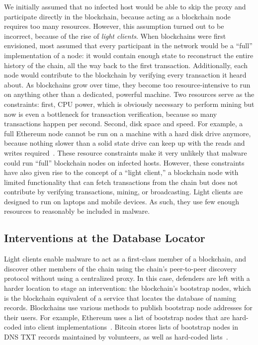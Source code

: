 We initially assumed that no infected host would be able to 
skip the proxy and participate directly 
in the blockchain, because acting as a blockchain node 
requires too many resources. However, this assumption turned 
out to be incorrect, because of the rise of \emph{light 
clients}. When blockchains were first envisioned, most 
assumed that every participant in the network would be a 
``full'' implementation of a node: it would contain 
enough state to reconstruct the entire history of the chain, 
all the way back to the first transaction. Additionally, each 
node would contribute to the 
blockchain by verifying every transaction it heard about. As 
blockchains grow over time, they become too 
resource-intensive to run on anything other than a dedicated, 
powerful machine. Two resources serve as 
the constraints: first, CPU power, which is obviously 
necessary to perform mining but now is even a bottleneck for 
transaction verification, because so many transactions happen 
per second. Second, disk space and speed. For example, a full 
Ethereum node cannot be run on a machine with a hard disk 
drive anymore, because nothing slower than a solid state 
drive can keep up with the reads and writes 
required~\cite{geth_faq}. These 
resource constraints make it 
very unlikely that malware could run ``full'' blockchain 
nodes on infected hosts. However, these constraints have also
given rise to the concept of a ``light client,'' a blockchain 
node with limited functionality that can fetch transactions 
from the chain but does not contribute by verifying 
transactions, mining, or broadcasting. Light clients are 
designed to run on laptops and mobile devices. As such, they 
use few enough resources to reasonably be included in 
malware. 


\subsection{Interventions at the Database Locator}

Light clients enable malware to act as a first-class member 
of a blockchain, and discover other members of the chain 
using the chain's peer-to-peer discovery protocol without 
using a centralized proxy. In this case, defenders are left 
with a harder location to stage an intervention: the 
blockchain's bootstrap nodes, which is the blockchain 
equivalent of a service that locates the database of naming 
records. Blockchains use various methods to publish bootstrap 
node addresses for their users. For 
example, Ethereum uses a list of bootstrap nodes 
that are hard-coded into 
client implementations~\cite{geth_bootstrap}. Bitcoin 
stores lists of bootstrap nodes in DNS TXT records maintained 
by volunteers, as 
well as hard-coded 
lists~\cite{bitcoin_bootstrap}.


